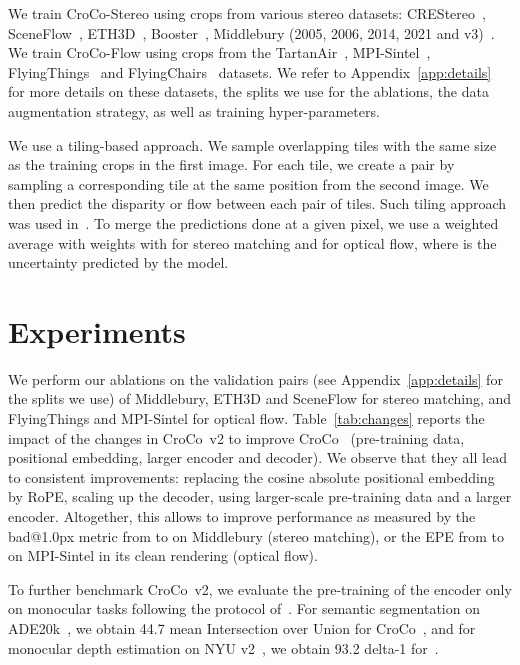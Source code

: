 \documentclass[10pt,twocolumn,letterpaper]{article}
\newcommand{\PAR}[1]{\noindent{\bf{#1.}}}
\newcommand{\croconew}{CroCo~v2\xspace}
\newcommand{\ours}{CroCo-Stereo\xspace}
\newcommand{\oursflow}{CroCo-Flow\xspace}
\begin{document}
\PAR{Training} We train \ours using  crops from various stereo datasets: CREStereo~\cite{crestereo}, SceneFlow~\cite{sceneflow}, ETH3D~\cite{eth3d}, Booster~\cite{booster}, Middlebury (2005, 2006, 2014, 2021 and v3)~\cite{middlebury}. We train \oursflow using  crops from the TartanAir~\cite{tartan}, MPI-Sintel~\cite{sintel}, FlyingThings~\cite{sceneflow} and FlyingChairs~\cite{flownet} datasets.
We refer to Appendix~\ref{app:details} for more details on these datasets, the splits we use for the ablations, the data augmentation strategy, as well as training hyper-parameters.

\PAR{Inference} We use a tiling-based approach.
We sample overlapping tiles with the same size as the training crops in the first image.
For each tile, we create a pair by sampling a corresponding tile at the same position from the second image.
We then predict the disparity or flow between each pair of tiles.
Such tiling approach was used \eg in~\cite{flowformer}. To merge the predictions done at a given pixel, we use a weighted average with weights  with  for stereo matching and  for optical flow, where  is the uncertainty predicted by the model.



\section{Experiments}
\label{sec:xp}

\PAR{Ablations}
We perform our ablations on the validation pairs (see Appendix~\ref{app:details} for the splits we use) of Middlebury, ETH3D and SceneFlow for stereo matching, and FlyingThings and MPI-Sintel for optical flow.
Table~\ref{tab:changes} reports the impact of the changes in \croconew to improve CroCo~\cite{croco} (pre-training data, positional embedding, larger encoder and decoder).
We observe that they all lead to consistent improvements: replacing the cosine absolute positional embedding by RoPE, scaling up the decoder, using larger-scale pre-training data and a larger encoder. Altogether, this allows \eg to improve performance as measured by the bad@1.0px metric from  to  on Middlebury (stereo matching), or the EPE from  to  on MPI-Sintel in its clean rendering (optical flow).

To further benchmark \croconew, we evaluate the pre-training of the encoder only on monocular tasks following the protocol of~\cite{multimae}. For semantic segmentation on ADE20k~\cite{ade}, we obtain 44.7 mean Intersection over Union  for CroCo~\cite{croco}, and for monocular depth estimation on NYU v2~\cite{nyuv2}, we obtain 93.2 delta-1  for~\cite{croco}.
\end{document}
